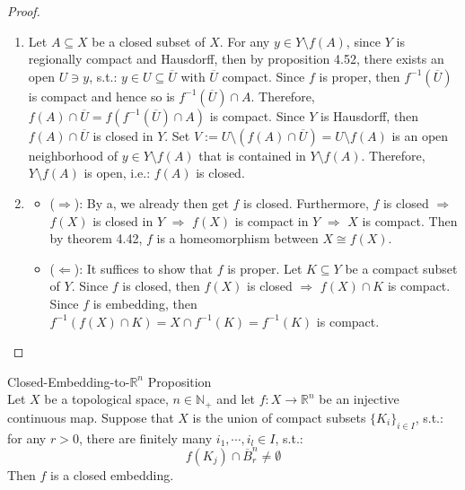\begin{proof}
    \begin{enumerate}
        \item Let $A \subseteq X$ be a closed subset of $X$. For any $y \in Y \setminus f(A)$, since $Y$ is regionally compact and Hausdorff, then by proposition 4.52, there exists an open $U \ni y$, s.t.: $y \in U \subseteq \overline{U}$ with $\overline{U}$ compact. Since $f$ is proper, then $f^{-1} (\overline{U})$ is compact and hence so is $f^{-1} (\overline{U}) \cap A$. Therefore, $f(A) \cap \overline{U} = f(f^{-1} (\overline{U}) \cap A)$ is compact. Since $Y$ is Hausdorff, then $f(A) \cap \overline{U}$ is closed in $Y$. Set $V:= U \setminus (f(A) \cap \overline{U}) = U \setminus f(A)$ is an open neighborhood of $y \in Y \setminus f(A)$ that is contained in $Y \setminus f(A)$. Therefore, $Y \setminus f(A)$ is open, i.e.: $f(A)$ is closed.

        \item \begin{itemize}
            \item ($\Rightarrow$): By a, we already then get $f$ is closed. Furthermore, $f$ is closed $\Rightarrow$ $f(X)$ is closed in $Y$ $\Rightarrow$ $f(X)$ is compact in $Y$ $\Rightarrow$ $X$ is compact. Then by theorem 4.42, $f$ is a homeomorphism between $X \cong f(X)$.
            \item ($\Leftarrow$): It suffices to show that $f$ is proper. Let $K \subseteq Y$ be a compact subset of $Y$. Since $f$ is closed, then $f(X)$ is closed $\Rightarrow$ $f(X) \cap K$ is compact. Since $f$ is embedding, then $f^{-1} (f(X) \cap K) = X \cap f^{-1} (K) = f^{-1} (K)$ is compact.
        \end{itemize}
    \end{enumerate}
\end{proof}

\begin{proposition}{Closed-Embedding-to-$\mathbb{R}^n$ Proposition}\\
Let $X$ be a topological space, $n \in \mathbb{N}_+$ and let $f: X \to \mathbb{R}^n$ be an injective continuous map. Suppose that $X$ is the union of compact subsets $\{K_i\}_{i\in I}$, s.t.: for any $r>0$, there are finitely many $i_1, \cdots, i_l \in I$, s.t.:
$$f(K_j) \cap \overline{B}_r^n \neq \emptyset$$
Then $f$ is a closed embedding.
\end{proposition}

